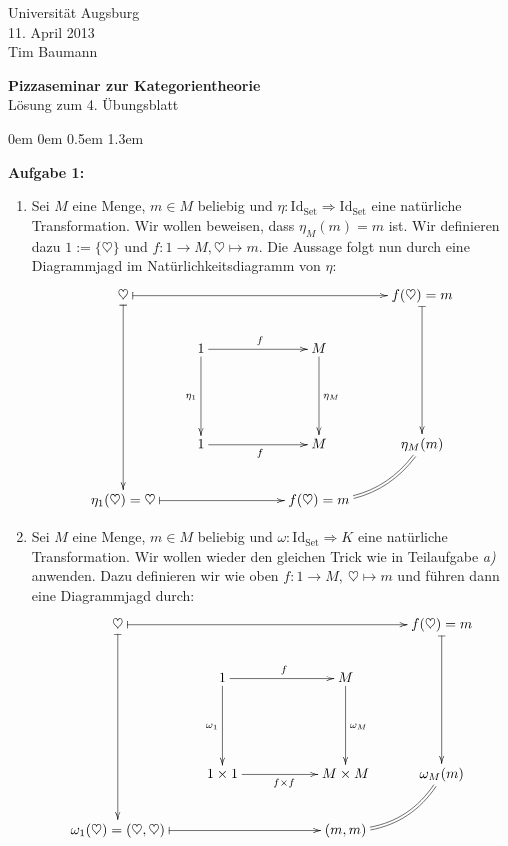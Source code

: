 \documentclass[a4paper,ngerman]{scrartcl}
\theoremstyle{definition}
\theoremstyle{plain}
\theoremstyle{remark}
\newcommand{\Set}{\mathrm{Set}}
\newcommand{\Id}{\mathrm{Id}}
\begin{document}
\vspace*{-4em}
\begin{flushright}Universität Augsburg \\ 11. April 2013 \\ Tim Baumann\end{flushright}

\begin{center}\Large \textbf{Pizzaseminar zur Kategorientheorie} \\
Lösung zum 4. Übungsblatt
\end{center}
\vspace{2em}


\begin{list}{}{0em \leftmargin0em \itemindent0.5em \itemsep 1.3em}
\item[\textbf{Aufgabe 1:}]\mbox{}

\begin{enumerate}
\item Sei $M$ eine Menge, $m \in M$ beliebig und $\eta:\Id_{\Set} \Rightarrow \Id_{\Set}$ eine natürliche Transformation. Wir wollen beweisen, dass $\eta_{M}(m) = m$ ist. Wir definieren dazu $1 := \{ \heartsuit \}$ und $f : 1 \to M, \heartsuit \mapsto m$. Die Aussage folgt nun durch eine Diagrammjagd im Natürlichkeitsdiagramm von $\eta$:
\[ \xymatrixcolsep{2pc}\xymatrix{
  \heartsuit \ar@{|->}[dddd] \ar@{|->}[rrrr] &&&& f(\heartsuit) = m \ar@{|->}[ddd] \\
  & 1 \ar[dd]_{\eta_{1}} \ar[rr]^{f} && M \ar[dd]^{\eta_{M}} \\
  \\
  & 1 \ar[rr]_{f} && M & \eta_{M}(m) \ar@{=}@/^1pc/[dl] \\
  \eta_{1}(\heartsuit) = \heartsuit \ar@{|->}[rrr] &&& f(\heartsuit) = m
} \]

\item Sei $M$ eine Menge, $m \in M$ beliebig und $\omega : \Id_{\Set} \Rightarrow K$ eine natürliche Transformation. Wir wollen wieder den gleichen Trick wie in Teilaufgabe \emph{a)} anwenden. Dazu definieren wir wie oben $f : 1 \to M,\ \heartsuit \mapsto m$ und führen dann eine Diagrammjagd durch:
\[ \xymatrixcolsep{2pc}\xymatrix{
  \heartsuit \ar@{|->}[dddd] \ar@{|->}[rrrr] &&&& f(\heartsuit) = m \ar@{|->}[ddd] \\
  & 1 \ar[dd]_{\omega_{1}} \ar[rr]^{f} && M \ar[dd]^{\omega_{M}} \\
  \\
  & 1 \times 1 \ar[rr]_{f \times f} && M \times M & \omega_{M}(m) \ar@{=}@/^1pc/[dl] \\
  \omega_{1}(\heartsuit) = (\heartsuit, \heartsuit) \ar@{|->}[rrr] &&& (m, m)
} \]


\end{enumerate}
\end{list}
\end{document}
